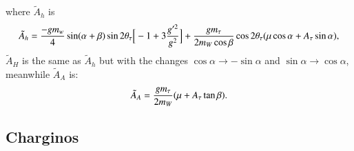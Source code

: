 \documentclass[final,3p,times]{elsarticle}
\begin{document}
where $\tilde{A}_h$ is
\begin{equation}
\begin{aligned}
\tilde{A}_h = {-g m_w \over 4} \sin(\alpha + \beta) \sin2\theta_{\tau}\Big[-1 + 3{g'^2 \over  g^2}\Big] + {g m_\tau \over 2 m_W \cos\beta}\cos2\theta_{\tau}(\mu\cos\alpha + A_\tau \sin\alpha),
\end{aligned}
\end{equation}
$\tilde{A}_H$ is the same as $\tilde{A}_h$ but with the changes $\cos\alpha \rightarrow -\sin\alpha$ and $\sin\alpha \rightarrow \cos\alpha$, meanwhile $\tilde{A}_A$ is:
\begin{equation}
\begin{aligned}
\tilde{A}_A = {g m_\tau \over 2 m_W} (\mu + A_\tau \tan\beta).
\end{aligned}
\end{equation}

\subsection{Charginos} \label{Charginos}
\end{document}
